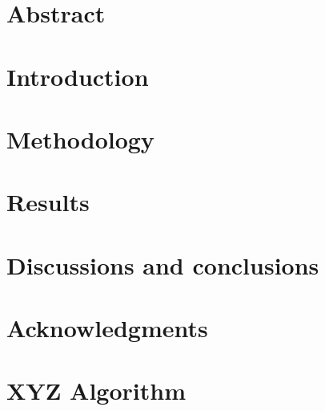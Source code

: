 \documentclass[12pt]{report}  %
\begin{document}
\chapter*{Abstract}
\begin{doublespacing}



\end{doublespacing}

\cleardoublepage
\setcounter{page}{1}
\chapter{Introduction}



\chapter{Methodology}


\chapter{Results}


\chapter{Discussions and conclusions}



\chapter{Acknowledgments}





\printbibliography


\appendix

\chapter{XYZ Algorithm}

\end{document}
